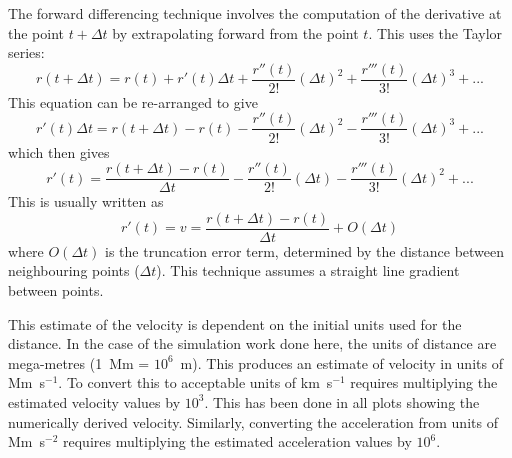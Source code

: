 \documentclass[namedreferences]{SolarPhysics}
\begin{document}
\begin{article}
The forward differencing technique involves the computation of the derivative at the point $t + \Delta t$ by extrapolating forward from the point $t$. This uses the Taylor series:
\begin{equation}
r(t + \Delta t) = r(t) + r'(t)\Delta t +  \frac{r''(t)}{2!}(\Delta t)^{2} + \frac{r'''(t)}{3!}(\Delta t)^{3}  + ...
\end{equation}
This equation can be re-arranged to give
\begin{equation}
r'(t)\Delta t = r(t + \Delta t) - r(t) -  \frac{r''(t)}{2!}(\Delta t)^{2} - \frac{r'''(t)}{3!}(\Delta t)^{3}  + ...
\end{equation}
which then gives
\begin{equation}
r'(t) = \frac{r(t + \Delta t) - r(t)}{\Delta t} -  \frac{r''(t)}{2!}(\Delta t) - \frac{r'''(t)}{3!}(\Delta t)^{2}  + ...
\end{equation}
This is usually written as
\begin{equation}
r'(t) = v = \frac{r(t + \Delta t) - r(t)}{\Delta t} + O(\Delta t)
\end{equation}
where $O(\Delta t)$ is the truncation error term, determined by the distance between neighbouring points ($\Delta t$). This technique assumes a straight line gradient between points. 

This estimate of the velocity is dependent on the initial units used for the distance. In the case of the simulation work done here, the units of distance are mega-metres (1~Mm = $10^6$~m). This produces an estimate of velocity in units of Mm~s$^{-1}$. To convert this to acceptable units of km~s$^{-1}$ requires multiplying the estimated velocity values by $10^{3}$. This has been done in all plots showing the numerically derived velocity. Similarly, converting the acceleration from units of Mm~s$^{-2}$ requires multiplying the estimated acceleration values by $10^{6}$.



\end{article}
\end{document}
